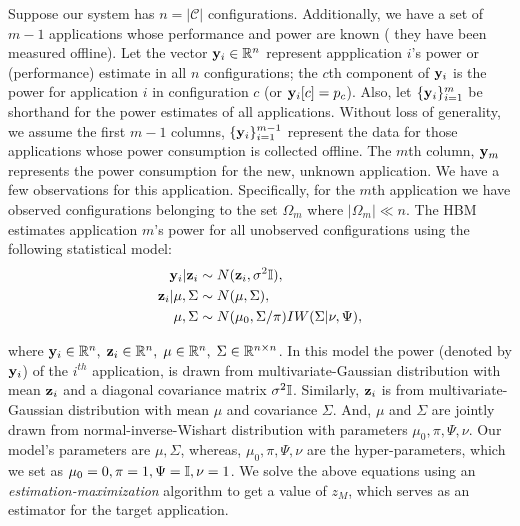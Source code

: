 Suppose our system has $n = |\mathcal{C}|$ configurations.    Additionally, we have a set of $m-1$
applications whose performance and power are known (\ie{} they have
been measured offline). Let the vector $\mathbf{y}_i \in \mathbb{R}^{n}$ represent
appplication $i$'s power or (performance) estimate in all $n$
configurations; \ie the $c$th component of $\mathbf{y}_i$ is the power for
application $i$ in configuration $c$ (or $\mathbf{y}_i[c] = p_c$).  Also, let
$\{\mathbf{y}_i\}_{i =1}^m$ be shorthand for the power estimates of all
applications.  Without loss of generality, we assume the first $m-1$
columns, \ie $\{\mathbf{y}_i\}_{i =1}^{m-1}$ represent the data for those
applications whose power consumption is collected offline.  The $m$th
column, $\mathbf{y}_m$ represents the power consumption for the new, unknown
application.  We have a few observations for this application.
Specifically, for the $m$th application we have observed
configurations belonging to the set $\Omega_m$ where $|\Omega_m| \ll
n$.  The HBM estimates application $m$'s power for all unobserved
configurations using the following statistical model:
\begin{equation}
\begin{aligned}
\mathbf{y}_i \vert \mathbf{z}_i  &\sim N( \mathbf{z}_i, \sigma^2 \mathbb{I}),\\
\mathbf{z}_i \vert \mu,\Sigma &\sim N(\mu, \Sigma),\\
\mu, \Sigma &\sim N(\mu_0,\Sigma / \pi)IW(\Sigma | \nu, \Psi),
\end{aligned}
\label{eq:HBN}
\end{equation}

where $\mathbf{y}_i \in \mathbb{R}^n, \; \mathbf{z}_i \in \mathbb{R}^n, \; \mu \in \mathbb{R}^{n}, \; \Sigma
\in \mathbb{R}^{n\times n}$. In this model the power (denoted by $\mathbf{y}_i$) of
the $i^{th}$ application, is drawn from multivariate-Gaussian
distribution with mean $\mathbf{z}_i$ and a diagonal covariance matrix
$\sigma^2\mathbb{I}$.  Similarly, $\mathbf{z}_i$ is from multi\-variate-Gaussian
distribution with mean $\mu$ and covariance $\Sigma$. And, $\mu$ and
$\Sigma$ are jointly drawn from normal-inverse-Wishart distribution
with parameters $\mu_0, \pi,\Psi, \nu$.  Our model's parameters are
$\mu,\Sigma$, whereas, $\mu_0, \pi,\Psi, \nu$ are the
hyper-para\-meters, which we set as $\mu_0 = 0, \pi = 1,\Psi = \mathbb{I}, \nu =
1$.  We solve the above equations using an
\emph{estimation-maximization} algorithm to get a value of $z_M$,
which serves as an estimator for the target application.





